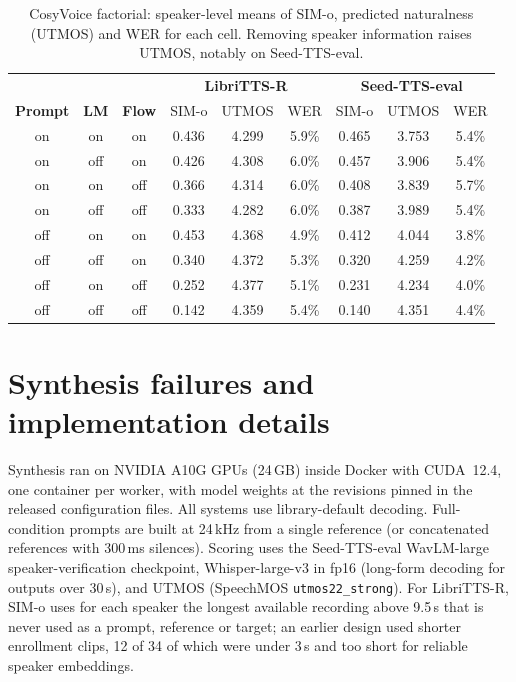 \documentclass[10pt]{article}
\begin{document}
\begin{table}[H]
\centering
\caption{CosyVoice factorial: speaker-level means of SIM-o, predicted naturalness (UTMOS) and WER for each cell. Removing speaker information raises UTMOS, notably on Seed-TTS-eval.}
\label{tab:sitesutmos}
\small
\begin{tabular}{ccc|ccc|ccc}
\toprule
& & & \multicolumn{3}{c|}{\textbf{LibriTTS-R}} & \multicolumn{3}{c}{\textbf{Seed-TTS-eval}} \\
\textbf{Prompt} & \textbf{LM} & \textbf{Flow} & SIM-o & UTMOS & WER & SIM-o & UTMOS & WER \\
\midrule
on & on & on & 0.436 & 4.299 & 5.9\% & 0.465 & 3.753 & 5.4\% \\
on & off & on & 0.426 & 4.308 & 6.0\% & 0.457 & 3.906 & 5.4\% \\
on & on & off & 0.366 & 4.314 & 6.0\% & 0.408 & 3.839 & 5.7\% \\
on & off & off & 0.333 & 4.282 & 6.0\% & 0.387 & 3.989 & 5.4\% \\
\midrule
off & on & on & 0.453 & 4.368 & 4.9\% & 0.412 & 4.044 & 3.8\% \\
off & off & on & 0.340 & 4.372 & 5.3\% & 0.320 & 4.259 & 4.2\% \\
off & on & off & 0.252 & 4.377 & 5.1\% & 0.231 & 4.234 & 4.0\% \\
off & off & off & 0.142 & 4.359 & 5.4\% & 0.140 & 4.351 & 4.4\% \\
\bottomrule
\end{tabular}
\end{table}

\section{Synthesis failures and implementation details}

\begin{table}[H]
\centering
\caption{Pathway-study utterances synthesised and failed per system. All 6{,}480 factorial utterances succeeded.}
\label{tab:failures}
\small

\end{table}

Synthesis ran on NVIDIA A10G GPUs (24\,GB) inside Docker with CUDA~12.4, one container per worker, with model weights at the revisions pinned in the released configuration files.
All systems use library-default decoding.
Full-condition prompts are built at 24\,kHz from a single reference (or concatenated references with 300\,ms silences).
Scoring uses the Seed-TTS-eval WavLM-large speaker-verification checkpoint, Whisper-large-v3 in fp16 (long-form decoding for outputs over 30\,s), and UTMOS (SpeechMOS \texttt{utmos22\_strong}).
For LibriTTS-R, SIM-o uses for each speaker the longest available recording above 9.5\,s that is never used as a prompt, reference or target; an earlier design used shorter enrollment clips, 12 of 34 of which were under 3\,s and too short for reliable speaker embeddings.
\end{document}
